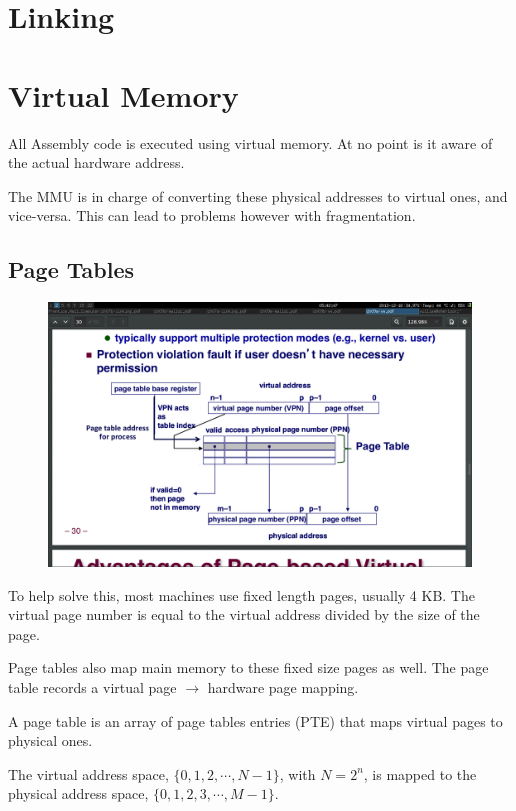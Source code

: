 \section{Linking}

\section{Virtual Memory}
All Assembly code is executed using virtual memory. At no point is it aware of the actual hardware address.

The MMU is in charge of converting these physical addresses to virtual ones, and vice-versa. This can lead to problems however with fragmentation.

    \subsection{Page Tables}
    \begin{figure}[ht]
        \centering
        \includegraphics[scale=0.2]{./img/pagetable.png}
    \end{figure}

    To help solve this, most machines use fixed length pages, usually 4 KB. The virtual page number is equal to the virtual address divided by the size of the page.

    Page tables also map main memory to these fixed size pages as well. The page table records a virtual page $\to$ hardware page mapping.

    A page table is an array of page tables entries (PTE) that maps virtual pages to physical ones.

    The virtual address space, $\{0, 1, 2, \cdots, N-1\}$, with $N = 2^n$, is mapped to the physical address space, $\{0, 1, 2, 3, \cdots, M - 1\}$.


